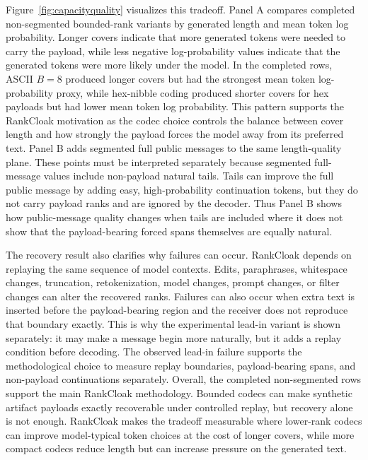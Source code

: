 \documentclass[fleqn,10pt]{wlscirep}
\begin{document}
Figure~\ref{fig:capacityquality} visualizes this tradeoff. Panel A compares completed non-segmented bounded-rank variants by generated length and mean token log probability. Longer covers indicate that more generated tokens were needed to carry the payload, while less negative log-probability values indicate that the generated tokens were more likely under the model. In the completed rows, ASCII \(B=8\) produced longer covers but had the strongest mean token log-probability proxy, while hex-nibble coding produced shorter covers for hex payloads but had lower mean token log probability. This pattern supports the RankCloak motivation as the codec choice controls the balance between cover length and how strongly the payload forces the model away from its preferred text.
Panel B adds segmented full public messages to the same length-quality plane. These points must be interpreted separately because segmented full-message values include non-payload natural tails. Tails can improve the full public message by adding easy, high-probability continuation tokens, but they do not carry payload ranks and are ignored by the decoder. Thus Panel B shows how public-message quality changes when tails are included where it does not show that the payload-bearing forced spans themselves are equally natural.

The recovery result also clarifies why failures can occur. RankCloak depends on replaying the same sequence of model contexts. Edits, paraphrases, whitespace changes, truncation, retokenization, model changes, prompt changes, or filter changes can alter the recovered ranks. Failures can also occur when extra text is inserted before the payload-bearing region and the receiver does not reproduce that boundary exactly. This is why the experimental lead-in variant is shown separately: it may make a message begin more naturally, but it adds a replay condition before decoding. The observed lead-in failure supports the methodological choice to measure replay boundaries, payload-bearing spans, and non-payload continuations separately.
Overall, the completed non-segmented rows support the main RankCloak methodology. Bounded codecs can make synthetic artifact payloads exactly recoverable under controlled replay, but recovery alone is not enough. RankCloak makes the tradeoff measurable where lower-rank codecs can improve model-typical token choices at the cost of longer covers, while more compact codecs reduce length but can increase pressure on the generated text.
\end{document}
